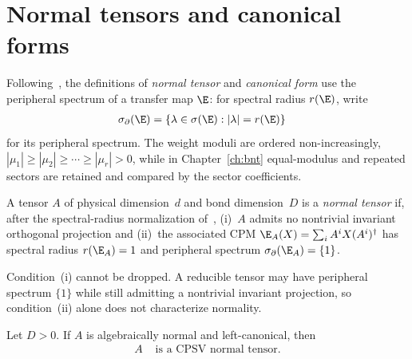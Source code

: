 \section{Normal tensors and canonical forms}\label{sec:cpsv_canonical_defs}

Following~\cite{Cirac2016MPDO_arXiv}, the definitions of \emph{normal tensor}
and \emph{canonical form} use the peripheral spectrum of a transfer map $\E$:
for spectral radius $r(\E)$, write
\begin{align}
    \sigma_\partial(\E)
     & =
    \{\lambda\in\sigma(\E):|\lambda|=r(\E)\}
    \label{eq:canonical_peripheral_spectrum}
\end{align}
for its peripheral spectrum. The weight moduli are ordered non-increasingly,
$|\mu_1|\ge|\mu_2|\ge\cdots\ge|\mu_r|>0$, while in Chapter~\ref{ch:bnt}
equal-modulus and repeated sectors are retained and compared by the sector
coefficients.

\begin{definition}\label{def:nt_cpsv}
    \leanok
    A tensor $A$ of physical dimension~$d$ and bond dimension~$D$ is a
    \emph{normal tensor} if, after the spectral-radius normalization
    of~\cite{Cirac2016MPDO_arXiv}, (i)~$A$ admits no nontrivial invariant
    orthogonal projection and (ii)~the associated CPM
    $\E_A(X)=\sum_i A^iX(A^i)^\dagger$ has spectral radius
    $r(\E_A)=1$ and peripheral spectrum $\sigma_\partial(\E_A)=\{1\}$.
\end{definition}

\begin{remark}
    Condition~(i) cannot be dropped. A reducible tensor may have peripheral
    spectrum $\{1\}$ while still admitting a nontrivial invariant projection,
    so condition~(ii) alone does not characterize normality.
\end{remark}

\begin{lemma}
    \label{thm:is_normal_tensor_of_is_normal_left_canonical}
    \leanok
    Let $D>0$. If $A$ is algebraically normal and left-canonical, then
    \begin{align}
        A
         & \text{ is a CPSV normal tensor}.
        \label{eq:is_normal_tensor_of_is_normal_left_canonical}
    \end{align}
\end{lemma}

